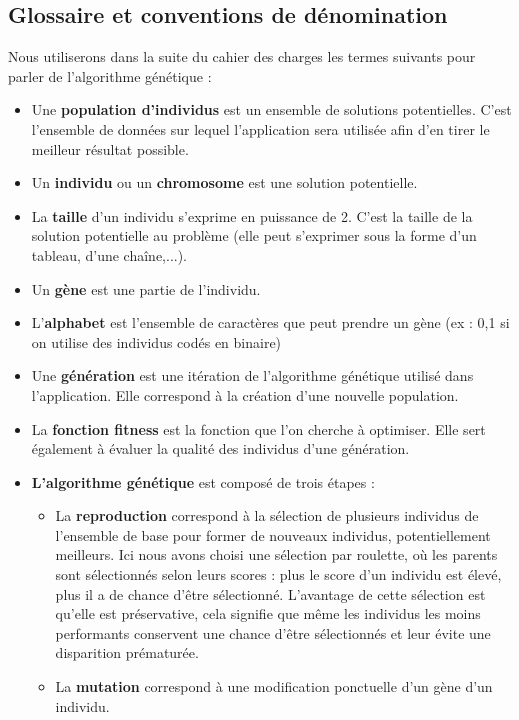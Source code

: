 \documentclass[a4paper,11pt]{article}
\begin{document}
		\subsection{Glossaire et conventions de dénomination}
			Nous utiliserons dans la suite du cahier des charges les termes suivants pour parler de l’algorithme génétique :\\
			\begin{itemize}
			\item Une \textbf{population d’individus} est un ensemble de solutions potentielles. C’est l’ensemble de données sur lequel l’application sera utilisée afin d’en tirer le meilleur résultat possible.
			\item Un \textbf{individu} ou un \textbf{chromosome} est une solution potentielle.
			\item La \textbf{taille} d’un individu s’exprime en puissance de 2. C’est la taille de la solution potentielle au problème (elle peut s’exprimer sous la forme d’un tableau, d’une chaîne,...).
			\item Un \textbf{gène}  est une partie de l'individu.
			\item L’\textbf{alphabet} est l’ensemble de caractères que peut prendre un gène (ex : {0,1} si on utilise des individus codés en binaire)
			\item Une \textbf{génération } est une itération de l’algorithme génétique utilisé dans l’application. Elle correspond à la création d'une nouvelle population. 
			\item La \textbf{fonction fitness} est la fonction que l’on cherche à optimiser. Elle sert également à évaluer la qualité des individus d'une génération.
			\item \textbf{L’algorithme génétique} est composé de trois étapes :
				\begin{itemize}
				\item La \textbf{reproduction} correspond à la sélection de plusieurs individus de l’ensemble de base pour former de nouveaux individus, potentiellement meilleurs.
				Ici nous avons choisi une sélection par roulette, où les parents sont sélectionnés selon leurs scores : plus le score d'un individu est élevé, plus il a de chance d'être sélectionné.
				L'avantage de cette sélection est qu'elle est préservative, cela signifie que même les individus les moins performants conservent une chance d’être sélectionnés et leur évite une disparition prématurée. 
				\item La \textbf{mutation} correspond à une modification ponctuelle d’un gène d'un individu.

\end{itemize}
\end{itemize}
\end{document}
